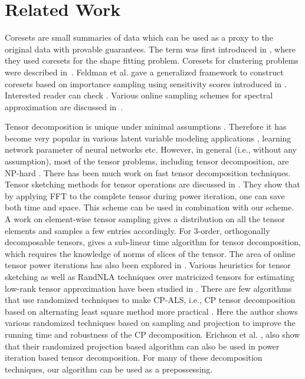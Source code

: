 \section{Related Work}{\label{sec:related}}
Coresets are small summaries of data which 
can be used as a proxy to the original data with provable guarantees. The term was first introduced in \cite{agarwal2004approximating}, where they used coresets for the shape fitting problem. Coresets for clustering problems were described in~\cite{har2004coresets}. 
Feldman et al. \cite{feldman2011unified} gave a generalized framework to construct coresets based on importance sampling using sensitivity scores introduced in \cite{langberg2010universal}. Interested reader can check \cite{woodruff2014sketching, braverman2016new, bachem2017practical}. Various online sampling schemes for spectral approximation are discussed in~\cite{cohen2016online, cohen2017input}. 

Tensor decomposition is unique under minimal assumptions \cite{kruskal1977three}. Therefore it has become very popular in various latent variable modeling applications \cite{anandkumar2014tensor, anandkumar2012method, hsu2012spectral}, learning network parameter of neural networks \cite{janzamin2015beating} etc. However, in general (i.e., without any assumption), most of the tensor problems, including tensor decomposition, are NP-hard \cite{hillar2013most}. There has been much work on fast tensor decomposition techniques. Tensor sketching methods for tensor operations are discussed in \cite{wang2015fast}. They show that by applying FFT to the complete tensor during power iteration, one can save both time and space. This scheme can be used in combination with our scheme. 
A work on element-wise tensor sampling \cite{bhojanapalli2015new} gives a distribution on all the tensor elements and samples a few entries accordingly. For $3$-order, orthogonally decomposable tensors, \cite{song2016sublinear} gives a sub-linear time algorithm for tensor decomposition, which requires the knowledge of norms of slices of the tensor. 
The area of online tensor power iterations has also been explored in \cite{huang2015online, wang2016online}. 
Various heuristics for tensor sketching as well as RandNLA techniques \cite{woodruff2014sketching} over matricized tensors for estimating low-rank tensor approximation have been studied in \cite{song2019relative}. There are few algorithms that use randomized techniques to make CP-ALS, i.e., CP tensor decomposition based on alternating least square method more practical \cite{battaglino2018practical, erichson2020randomized}. Here the author shows various randomized techniques based on sampling and projection to improve the running time and robustness of the CP decomposition. Erichson et al. \cite{erichson2020randomized}, also show that their randomized projection based algorithm can also be used in power iteration based tensor decomposition. For many of these decomposition techniques, our algorithm can be used as a prepossessing. 

